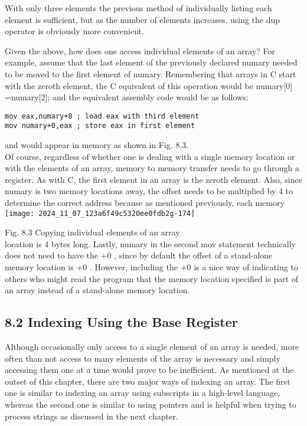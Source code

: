 \documentclass[10pt]{article}
\begin{document}
With only three elements the previous method of individually listing each element is sufficient, but as the number of elements increases, using the dup operator is obviously more convenient.

Given the above, how does one access individual elements of an array? For example, assume that the last element of the previously declared numary needed to be moved to the first element of numary. Remembering that arrays in C start with the zeroth element, the C equivalent of this operation would be numary[0] =numary[2]; and the equivalent assembly code would be as follows:

\begin{verbatim}
mov eax,numary+8 ; load eax with third element
mov numary+0,eax ; store eax in first element
\end{verbatim}

and would appear in memory as shown in Fig. 8.3.\\
Of course, regardless of whether one is dealing with a single memory location or with the elements of an array, memory to memory transfer needs to go through a register. As with C, the first element in an array is the zeroth element. Also, since numary is two memory locations away, the offset needs to be multiplied by 4 to determine the correct address because as mentioned previously, each memory\\
\texttt{[image: 2024\_11\_07\_123a6f49c5320ee0fdb2g-174]}

Fig. 8.3 Copying individual elements of an array\\
location is 4 bytes long. Lastly, numary in the second mov statement technically does not need to have the +0 , since by default the offset of a stand-alone memory location is +0 . However, including the +0 is a nice way of indicating to others who might read the program that the memory location specified is part of an array instead of a stand-alone memory location.

\subsection*{8.2 Indexing Using the Base Register}
Although occasionally only access to a single element of an array is needed, more often than not access to many elements of the array is necessary and simply accessing them one at a time would prove to be inefficient. As mentioned at the outset of this chapter, there are two major ways of indexing an array. The first one is similar to indexing an array using subscripts in a high-level language, whereas the second one is similar to using pointers and is helpful when trying to process strings as discussed in the next chapter.
\end{document}
